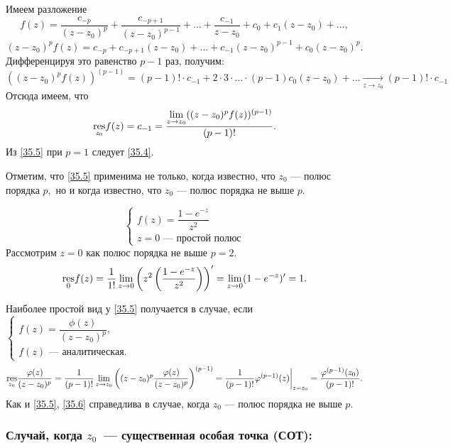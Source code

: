 \documentclass[../../main.tex]{subfiles}
\begin{document}
	Имеем разложение 
	\[
		f(z) = \frac{c_{-p}}{(z-z_0)^{p}} + \frac{c_{-p+1}}{(z-z_0)^{p-1}} + \ldots + 
		\frac{c_{-1}}{z-z_0} + c_0 + c_1(z-z_0) + \ldots,
	\]
	\[
		(z-z_0)^pf(z) = c_{-p} + c_{-p+1}(z-z_0) + \ldots + c_{-1}(z-z_0)^{p-1} + 
		c_0(z-z_0)^p.
	\]
	Дифференцируя это равенство $p-1$ раз, получим:
	\[
		((z-z_0)^pf(z))^{(p-1)} = (p-1)!\cdot c_{-1} + 2 \cdot 3 \cdot \ldots \cdot 
		(p-1)c_0(z-z_0) + \ldots 
		\underset{z \to z_0}{\to} (p-1)!\cdot c_{-1}
	\]
	Отсюда имеем, что
	\begin{equation} \label{35.5}
		\underset{z_0}{\operatorname{res}} f(z) = c_{-1} = \frac{
		\lim\limits_{z\to z_0} ((z-z_0)^pf(z))^{(p-1)} }{(p-1)!}.
	\end{equation}
	Из \eqref{35.5} при $p=1$ следует \eqref{35.4}.
	
	Отметим, что \eqref{35.5} применима не только, когда известно, что $z_0$ --- 
	полюс порядка $p,$ но и когда известно, что $z_0$ --- полюс порядка не выше 
	$p.$
	
	\begin{example}
		\[
			\begin{cases}
				f(z) = \dfrac{1-e^{-z}}{z^2} \\
				z = 0 \text{ --- простой полюс}
			\end{cases}
		\]
		Рассмотрим $z = 0$ как полюс порядка не выше $p=2.$
		\[
			\underset{0}{\operatorname{res}}f(z) = \dfrac{1}{1!}\lim_{z\to 
			0}\left(z^2\left(\dfrac{1-e^{-z}}{z^2}\right)\right)' = 
			\lim_{z\to 0} (1 - e^{-z})' = 1.
		\]
	\end{example}
	
	\medskip
	
	Наиболее простой вид у \eqref{35.5} получается в случае, если $\begin{cases}
	f(z)  = \dfrac{\phi(z)}{(z-z_0)^p}, \\
	f(z) \text{ --- аналитическая.}
	\end{cases}$
	\begin{equation} \label{35.6}
		\underset{z_0}{\operatorname{res}}  \frac{\varphi(z)}{(z-z_0)^p} = \frac{1}{(p-1)!}
		 \lim\limits_{z\to z_0} \left((z-z_0)^p 
		 \frac{\varphi(z)}{(z-z_0)^p}\right)^{(p-1)} = 
		 \frac{1}{(p-1)!} \varphi^{(p-1)}(z)\bigg|_{z = z_0} = 
		 \frac{\varphi^{(p-1)}(z_0)}{(p-1)!}.
	\end{equation}
	Как и \eqref{35.5}, \eqref{35.6} справедлива в случае, когда $z_0$ --- полюс 
	порядка не выше $p$.
	
	\subsubsection*{Случай, когда $z_0$~--- существенная особая точка (СОТ):}
	
\end{document}
